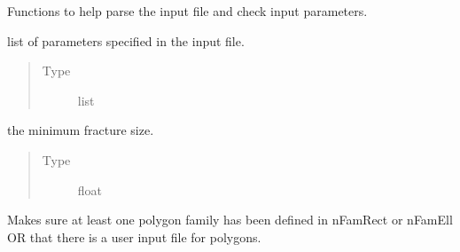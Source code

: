 \documentclass[letterpaper,10pt,english]{sphinxmanual}
\begin{document}

\begin{fulllineitems}
\label{\detokenize{pydfnworks:pydfnworks.dfnGen.gen_input.input_helper}}
Functions to help parse the input file and check input parameters.


\begin{fulllineitems}
list of parameters specified in the input file.
\begin{quote}\begin{description}
\item[{Type}] \leavevmode
list

\end{description}\end{quote}

\end{fulllineitems}



\begin{fulllineitems}
the minimum fracture size.
\begin{quote}\begin{description}
\item[{Type}] \leavevmode
float

\end{description}\end{quote}

\end{fulllineitems}


\begin{fulllineitems}
\label{\detokenize{pydfnworks:pydfnworks.dfnGen.gen_input.input_helper.check_fam_count}}
Makes sure at least one polygon family has been defined in nFamRect or nFamEll
OR that there is a user input file for polygons.

\end{fulllineitems}


\end{fulllineitems}
\end{document}
